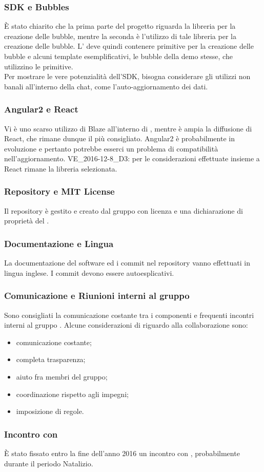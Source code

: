 \subsubsection{SDK e Bubbles}
È stato chiarito che la prima parte del progetto riguarda la libreria per la creazione delle bubble, mentre la seconda è l'utilizzo di tale libreria per la creazione delle bubble. L' deve quindi contenere primitive per la creazione delle bubble e alcuni template esemplificativi, le bubble della demo stesse, che utilizzino le primitive.\\
Per mostrare le vere potenzialità dell'SDK, bisogna considerare gli utilizzi non banali all'interno della chat, come l'auto-aggiornamento dei dati.

\subsubsection{Angular2 e React}
Vi è uno scarso utilizzo di Blaze all'interno di , mentre è ampia la diffusione di React, che rimane dunque il più consigliato. Angular2 è probabilmente in evoluzione e pertanto potrebbe esserci un problema di compatibilità nell'aggiornamento.
VE_2016-12-8_D3: per le considerazioni effettuate insieme a \Proponente React rimane la libreria selezionata.

\subsubsection{Repository e MIT License}
Il repository è gestito e creato dal gruppo \GroupName{} con licenza  e una dichiarazione di proprietà del \Proponente{}.

\subsubsection{Documentazione e Lingua}
La documentazione del software ed i commit nel repository vanno effettuati in lingua inglese. I commit devono essere autoesplicativi.

\subsubsection{Comunicazione e Riunioni interni al gruppo \GroupName{}}
Sono consigliati la comunicazione costante tra i componenti e frequenti incontri interni al gruppo \GroupName{}. Alcune considerazioni di \Proponente{} riguardo alla collaborazione sono: 
\begin{itemize}
	\item comunicazione costante;
	\item completa trasparenza;
	\item aiuto fra membri del gruppo;
	\item coordinazione rispetto agli impegni;
	\item imposizione di regole.
\end{itemize}

\subsubsection{Incontro con \Proponente}
È stato fissato entro la fine dell'anno 2016 un incontro con \Proponente{}, probabilmente durante il periodo Natalizio.

\clearpage

